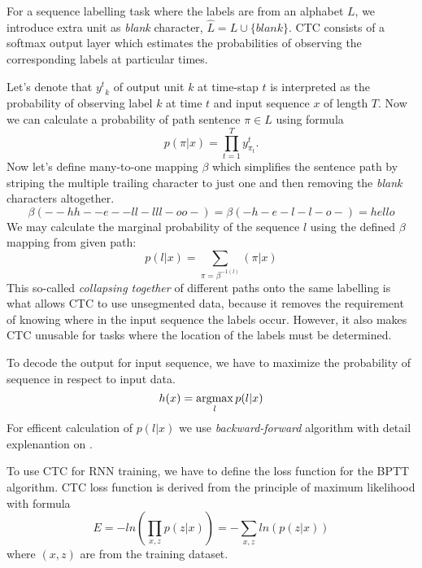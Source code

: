 For a sequence labelling task where the labels are from an alphabet $L$, we introduce extra unit as \textit{blank} character, $\hat{L}=L\cup\{blank\}$.
CTC consists of a softmax output layer which estimates the probabilities of observing the corresponding labels at particular times\cite{ctc_info}.

Let's denote that ${y^t}_{k}$ of output unit $k$ at time-stap $t$ is interpreted as the probability of observing label $k$ at time $t$ and input sequence $x$ of length $T$.
Now we can calculate a probability of path sentence $\pi\in\hat{L}$ using formula
\begin{equation} \label{eq:7}
  p(\pi|x) = \prod_{t=1}^{T}y^{t}_{\pi_t}.
\end{equation}
Now let's define many-to-one mapping $\beta$ which simplifies the sentence path by striping the multiple trailing character to just one and then removing the \textit{blank} characters altogether.
\[ \beta(--hh--e--ll-lll-oo-) = \beta(-h-e-l-l-o-) = hello \]
We may calculate the marginal probability of the sequence $l$ using the defined $\beta$ mapping from given path:
\begin{equation} \label{eq:8}
  p(l|x) = \sum_{\pi=\beta^{-1(l)}}(\pi|x)
\end{equation}
This so-called \textit{collapsing together} of different paths onto the same labelling is what allows CTC to use unsegmented data, because it removes the requirement of knowing where in the input sequence the labels occur.
However, it also makes CTC unusable for tasks where the location of the labels must be determined\cite{ctc_info}.

To decode the output for input sequence, we have to maximize the probability of sequence in respect to input data.
\begin{equation} \label{eq:9}
  h(x) = \operatorname*{argmax}_l p(l|x)
\end{equation}
For efficent calculation of $p(l|x)$ we use \textit{backward-forward} algorithm with detail explenantion on \cite{ctc}.

To use CTC for RNN training, we have to define the loss function for the BPTT algorithm.
CTC loss function is derived from the principle of maximum likelihood with formula
\begin{equation} \label{eq:10}
  E = -ln(\prod_{x,z}p(z|x)) = - \sum_{x,z} ln(p(z|x))
\end{equation}
where $(x,z)$ are from the training dataset\cite{ctc_info}.

